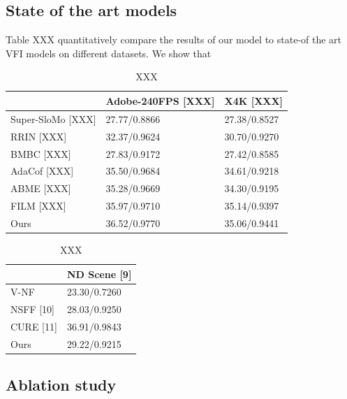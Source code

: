 \documentclass{article}
\begin{document}
\subsection{State of the art models}
\label{sec_sota}
Table XXX quantitatively compare the results of our model to state-of the art VFI models on different datasets.
We show that


\begin{table}[]
\caption{XXX}
\begin{tabular}{l | l | l }
 &  Adobe-240FPS  [XXX] &  X4K [XXX]  \\
\hline
Super-SloMo [XXX] &  27.77/0.8866 & 27.38/0.8527  \\
RRIN [XXX]  & 32.37/0.9624 & 30.70/0.9270  \\
BMBC [XXX]  & 27.83/0.9172 & 27.42/0.8585   \\
AdaCof [XXX] & 35.50/0.9684 & 34.61/0.9218 \\
ABME   [XXX] & 35.28/0.9669 & 34.30/0.9195 \\
FILM   [XXX] &	35.97/0.9710 & 35.14/0.9397 \\
Ours	& 36.52/0.9770 & 35.06/0.9441 \\
\end{tabular}

\end{table}



\begin{table}[]
\caption{XXX}
\begin{tabular}{l | l }
	    &   ND Scene [9] \\
\hline
V-NF        &  23.30/0.7260\\
NSFF [10]   & 28.03/0.9250\\
CURE [11]   & 36.91/0.9843\\
Ours	    &  29.22/0.9215
\end{tabular}

\end{table}



\subsection{Ablation study}
\label{sec_abl}
\end{document}
